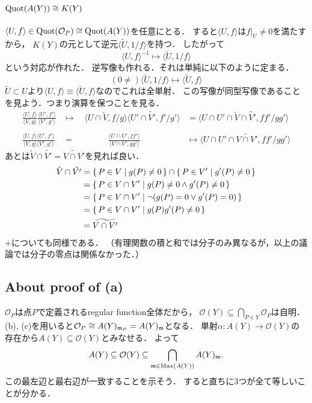 \documentclass[a4paper]{jarticle}
\begin{document}
    \paragraph{$\operatorname{Quot}(A(Y)) \cong K(Y)$}
    $\langle U, f \rangle \in \operatorname{Quot}(\mathcal{O}_P) \cong \operatorname{Quot}(A(Y))$を任意にとる．
    すると$\langle U, f \rangle$は$f|_U \neq 0$を満たすから，
    $K(Y)$の元として逆元$\langle \tilde{U}, 1/f \rangle$を持つ．
    したがって
    \[ \langle U, f \rangle^{-1} \mapsto \langle \tilde{U}, 1/f \rangle \]
    という対応が作れた．
    逆写像も作れる．それは単純に以下のように定まる．
    \[ (0 \neq )\langle \tilde{U}, 1/f \rangle \mapsto \langle \tilde{U}, f \rangle \]
    $\tilde{U} \subset U$より$\langle U, f \rangle \equiv \langle \tilde{U}, f \rangle$なのでこれは全単射．
    この写像が同型写像であることを見よう．つまり演算を保つことを見る．
    \begin{align*}
        \frac{\langle U,f \rangle}{\langle V,g \rangle} \frac{\langle U',f' \rangle}{\langle V',g' \rangle}
        &\mapsto \quad
        \langle U \cap \tilde{V},f/g \rangle \langle U' \cap \tilde{V'},f'/g' \rangle
        &=
        \langle U \cap U' \cap \tilde{V} \cap \tilde{V'},ff'/gg' \rangle
        \\ \\
        \frac{\langle U, f \rangle \langle U', f' \rangle}{\langle V, g \rangle \langle V', g' \rangle}
        &= \qquad\qquad
        \frac{\langle U \cap U', ff' \rangle}{\langle V \cap V', gg' \rangle}
        &\mapsto
        \langle U \cap U' \cap \widetilde{V \cap V'}, ff'/gg' \rangle
    \end{align*}
    あとは$\tilde{V} \cap \tilde{V'}=\widetilde{V \cap V'}$を見れば良い．
    \begin{align*}
        \tilde{V} \cap \tilde{V'}
        &=\set{P \in V | g(P) \neq 0} \cap \set{P \in V' | g'(P) \neq 0} \\
        &=\set{P \in V \cap V' | g(P) \neq 0 \land g'(P) \neq 0} \\
        &=\set{P \in V \cap V' | \lnot(g(P)=0 \lor g'(P)=0)} \\
        &=\set{P \in V \cap V' | g(P)g'(P) \neq 0} \\
        &=\widetilde{V \cap V'}
    \end{align*}
    $+$についても同様である．
    （有理関数の積と和では分子のみ異なるが，以上の議論では分子の零点は関係なかった．）

    \subsection{About proof of (a)}
    $\mathcal{O}_P$は点$P$で定義されるregular function全体だから，
    $\mathcal{O}(Y) \subseteq \bigcap_{P \in Y} \mathcal{O}_P$は自明．
    (b), (c)を用いると$\mathcal{O}_P \cong A(Y)_{\mathfrak{m}_P} = A(Y)_{\mathfrak{m}}$となる．
    単射$\alpha: A(Y) \to \mathcal{O}(Y)$の存在から$A(Y) \subseteq \mathcal{O}(Y)$とみなせる．
    よって
    \[ A(Y) \subseteq \mathcal{O}(Y) \subseteq \bigcap_{\mathfrak{m} \in \operatorname{Max}(A(Y))} A(Y)_{\mathfrak{m}}. \]
    この最左辺と最右辺が一致することを示そう．
    すると直ちに3つが全て等しいことが分かる．
\end{document}
